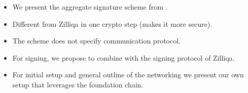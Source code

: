 \begin{frame}
\begin{itemize}
\item We present the aggregate signature scheme from \cite[MPSW18]{cryptoeprintSimpleSchnorrMultisignatures}.
\item Different from Zilliqa in one crypto step (makes it more secure).
\item The scheme does not specify communication protocol.
\item For signing, we propose to combine \cite[MPSW18]{cryptoeprintSimpleSchnorrMultisignatures} with the signing protocol of Zilliqa.
\item For initial setup and general outline of the networking we present our own setup that leverages the foundation chain.



\end{itemize}
\end{frame}

